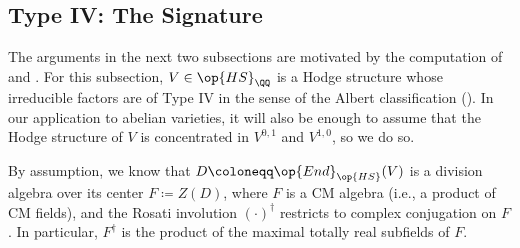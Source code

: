 \documentclass[../thesis.tex]{subfiles}
\begin{document}
\subsection{Type IV: The Signature} \label{subsec:signature}
The arguments in the next two subsections are motivated by the computation of \cite[Lemma~4.2]{yu-mumford-tate-cm} and \cite[Proposition~1.1]{yanai-degenerate-cm-type}. For this subsection, $V\in\op{HS}_\QQ$ is a Hodge structure whose irreducible factors are of Type IV in the sense of the Albert classification (). In our application to abelian varieties, it will also be enough to assume that the Hodge structure of $V$ is concentrated in $V^{0,1}$ and $V^{1,0}$, so we do so.

By assumption, we know that $D\coloneqq\op{End}_{\op{HS}}(V)$ is a division algebra over its center $F\coloneqq Z(D)$, where $F$ is a CM algebra (i.e., a product of CM fields), and the Rosati involution $(\cdot)^\dagger$ restricts to complex conjugation on $F$. In particular, $F^\dagger$ is the product of the maximal totally real subfields of $F$.
\end{document}
